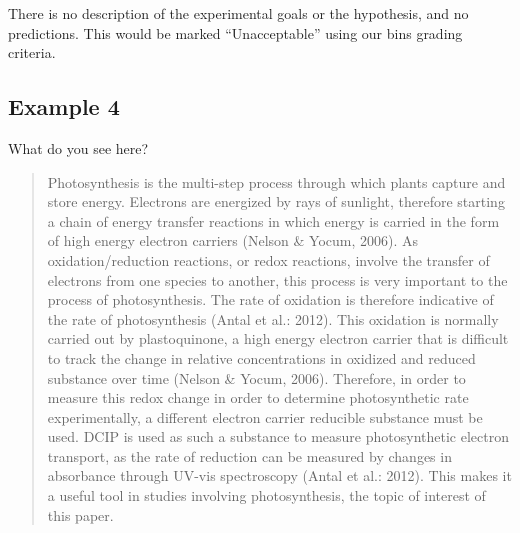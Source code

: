 \documentclass[
]{book}
\begin{document}
There is no description of the experimental goals or the hypothesis, and no predictions. This would be marked ``Unacceptable'' using our bins grading criteria.

\hypertarget{example-4}{%
\subsection{Example 4}\label{example-4}}

What do you see here?

\begin{quote}
Photosynthesis is the multi-step process through which plants capture and store energy. Electrons are energized by rays of sunlight, therefore starting a chain of energy transfer reactions in which energy is carried in the form of high energy electron carriers (Nelson \& Yocum, 2006). As oxidation/reduction reactions, or redox reactions, involve the transfer of electrons from one species to another, this process is very important to the process of photosynthesis. The rate of oxidation is therefore indicative of the rate of photosynthesis (Antal et al.: 2012). This oxidation is normally carried out by plastoquinone, a high energy electron carrier that is difficult to track the change in relative concentrations in oxidized and reduced substance over time (Nelson \& Yocum, 2006). Therefore, in order to measure this redox change in order to determine photosynthetic rate experimentally, a different electron carrier reducible substance must be used. DCIP is used as such a substance to measure photosynthetic electron transport, as the rate of reduction can be measured by changes in absorbance through UV-vis spectroscopy (Antal et al.: 2012). This makes it a useful tool in studies involving photosynthesis, the topic of interest of this paper.
\end{quote}
\end{document}
